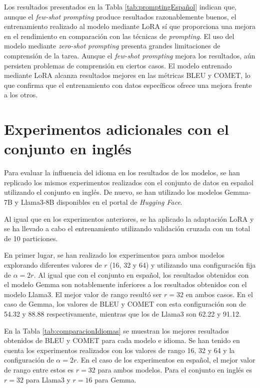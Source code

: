 \documentclass[11pt,spanish,listoffigures,listoftables]{tfgetsinf}
\begin{document}
Los resultados presentados en la Tabla \ref{tab:promptingEspañol} indican que, aunque el \textit{few-shot prompting} produce resultados razonablemente buenos, el entrenamiento realizado al modelo mediante LoRA sí que proporciona una mejora en el rendimiento en comparación con las técnicas de \textit{prompting}. El uso del modelo mediante \textit{zero-shot prompting} presenta grandes limitaciones de comprensión de la tarea. Aunque el \textit{few-shot prompting} mejora los resultados, aún persisten problemas de comprensión en ciertos casos. El modelo entrenado mediante LoRA alcanza resultados mejores en las métricas BLEU y COMET, lo que confirma que el entrenamiento con datos específicos ofrece una mejora frente a los otros.

\section{Experimentos adicionales con el conjunto en inglés}

Para evaluar la influencia del idioma en los resultados de los modelos, se han replicado los mismos experimentos realizados con el conjunto de datos en español utilizando el conjunto en inglés. De nuevo, se han utilizado los modelos Gemma-7B y Llama3-8B disponibles en el portal de \textit{Hugging Face}.

Al igual que en los experimentos anteriores, se ha aplicado la adaptación LoRA y se ha llevado a cabo el entrenamiento utilizando validación cruzada con un total de 10 particiones.

En primer lugar, se han realizado los experimentos para ambos modelos explorando diferentes valores de $r$ (16, 32 y 64) y utilizando una configuración  fija de $\alpha = 2r$. Al igual que con el conjunto en español, los resultados obtenidos con el modelo Gemma son notablemente inferiores a los resultados obtenidos con el modelo Llama3. El mejor valor de rango resultó ser $r = 32$ en ambos casos. En el caso de Gemma, los valores de BLEU y COMET con esta configuración son de 54.32 y 88.88 respectivamente, mientras que los de Llama3 son 62.22 y 91.12.

En la Tabla \ref{tab:comparacionIdiomas} se muestran los mejores resultados obtenidos de BLEU y COMET para cada modelo e idioma. Se han tenido en cuenta los experimentos realizados con los valores de rango 16, 32 y 64 y la configuración de $\alpha = 2r$. En el caso de los experimentos en español, el mejor valor de rango entre estos es $r = 32$ para ambos modelos. Para el conjunto en inglés es $r = 32$ para Llama3 y $r = 16$ para Gemma.
\end{document}
